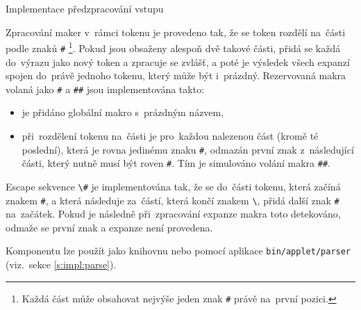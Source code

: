 \documentclass[thesis=M,czech]{FITthesis}[2012/06/26]
\newcommand{\id}[1]{\texttt{#1}}
\newcommand{\rf}[1]{\ref{#1}}
\newcommand{\binDir}{\id{bin}}
\newcommand{\appletDir}{\id{\binDir{}/\-applet}}
\newcommand{\appletFn}[1]{\id{\appletDir{}/\-#1}}
\begin{document}
\begin{section}{Implementace předzpracování vstupu}

\begin{paragraph}{Zpracování maker v~rámci tokenu}
\label{s:impl:preprocess:in_token}
je provedeno tak, že se token rozdělí na~části
podle znaků \id{\#}%
\footnote{Každá část může obsahovat nejvýše jeden znak \id{\#}
právě na~první pozici.}.
Pokud jsou obsaženy alespoň dvě takové části,
přidá se každá do~výrazu
jako nový token a zpracuje se zvlášť,
a poté je výsledek všech expanzí spojen do~právě jednoho tokenu,
který může být i~prázdný.
Rezervovaná makra volaná jako \id{\#} a \id{\#\#}
jsou implementována takto:
\begin{itemize}
\item je přidáno globální makro s~prázdným názvem,
\item při~rozdělení tokenu na~části
   je pro~každou nalezenou část (kromě té poslední),
   která je rovna jedinému znaku \id{\#},
   odmazán první znak z~následující části,
   který nutně musí být roven \id{\#}.
   Tím je simulováno volání makra \id{\#\#}.
\end{itemize}
\end{paragraph} %


\begin{paragraph}{Escape sekvence}\label{s:impl:preprocess:escape}
\id{\textbackslash\#}
je implementována tak,
že se do~části tokenu, která začíná znakem \id{\#},
a která následuje za~částí,
která končí znakem \id{\textbackslash},
přidá další znak \id{\#} na~začátek.
Pokud je následně při~zpracování expanze makra
toto detekováno, odmaže se první znak
a expanze není provedena.
\end{paragraph} %


\bigskip

Komponentu lze použít jako knihovnu
nebo pomocí aplikace \appletFn{parser}
(viz.~sekce \rf{s:impl:parse}).
\end{section} %


\end{document}
